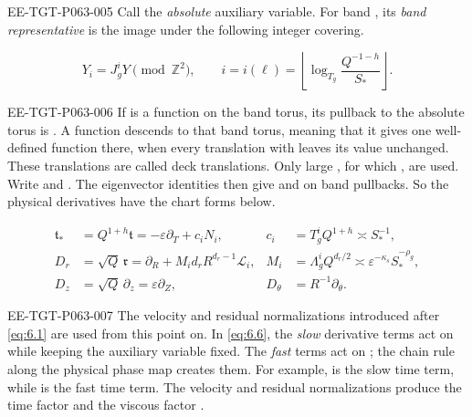 \begin{EESegment}{EE-TGT-P063-005}
Call  the \emph{absolute} auxiliary variable. For band , its \emph{band representative} is the image  under the following integer covering.
\end{EESegment}
\begin{equation}
 Y_i=J_g^iY\pmod{\mathbb Z^2},
 \qquad
 i=i(\ell)=\left\lfloor\log_{T_g}\frac{Q^{-1-h}}{S_*}\right\rfloor.
 \tag{6.5}\label{eq:6.5}
\end{equation}
\begin{EESegment}{EE-TGT-P063-006}
If  is a function on the band torus, its pullback to the absolute torus is . A function descends to that band torus, meaning that it gives one well-defined function there, when every translation  with  leaves its value unchanged. These translations are called deck translations. Only large , for which , are used. Write  and . The eigenvector identities then give  and  on band pullbacks. So the physical derivatives have the chart forms below.
\end{EESegment}
\begin{equation}
\begin{aligned}
 \mathfrak t_*&=Q^{1+h}\mathfrak t=-\varepsilon\partial_T+c_iN_i,
 &c_i&=T_g^iQ^{1+h}\asymp S_*^{-1},\\
 D_r&=\sqrt Q\,\mathfrak r=\partial_R+M_id_rR^{d_r-1}\mathcal L_i,
 &M_i&=\Lambda_g^iQ^{d_r/2}\asymp\varepsilon^{-\kappa_s}S_*^{-\rho_g},\\
 D_z&=\sqrt Q\,\partial_z=\varepsilon\partial_Z,
 &D_\theta&=R^{-1}\partial_\theta.
\end{aligned}
\tag{6.6}\label{eq:6.6}
\end{equation}
\begin{EESegment}{EE-TGT-P063-007}
The velocity and residual normalizations introduced after \eqref{eq:6.1} are used from this point on. In \eqref{eq:6.6}, the \emph{slow} derivative terms act on  while keeping the auxiliary variable  fixed. The \emph{fast} terms act on ; the chain rule along the physical phase map creates them. For example,  is the slow time term, while  is the fast time term. The velocity and residual normalizations produce the time factor  and the viscous factor .
\end{EESegment}


